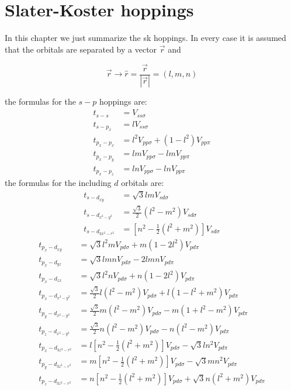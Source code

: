 \chapter{Slater-Koster hoppings}
\label{SKhoppings}
In this chapter we just summarize the \ac{sk} hoppings. In every case it is assumed that the orbitals are separated by a vector $\vec{r}$ and

\begin{equation*}
  \vec{r} \longrightarrow \hat{r}=\frac{\vec{r}}{|\vec{r}|} = (l,m,n)
\end{equation*}

the formulas for the $s-p$ hoppings are:
\begin{equation}
\begin{split}
  t_{s-s} &= V_{ss\sigma}\\
  t_{s-p_x} &= l V_{ss\sigma}\\
  t_{p_x-p_x} &= l^2 V_{pp\sigma} + \left(1-l^2\right) V_{pp\pi}\\
  t_{p_x-p_y} &= lm V_{pp\sigma} - lm V_{pp\pi}\\
  t_{p_x-p_z} &= ln V_{pp\sigma} - ln V_{pp\pi}
\end{split}
\end{equation}
the formulas for the including $d$ orbitals are:
\begin{equation*}
\begin{split}
  t_{s-d_{xy}} &= \sqrt{3}lm V_{sd\sigma}\\
  t_{s-d_{x^2-y^2}} &= \tfrac{\sqrt{3}}{2} (l^2-m^2) V_{sd\sigma}\\
  t_{s-d_{3x^2-r^2}} &= \left[n^2-\frac{1}{2}(l^2+m^2)\right] V_{sd\sigma}
\end{split}
\end{equation*}
\begin{equation*}
\begin{split}
  t_{p_x-d_{xy}} &= \sqrt{3}l^2m V_{pd\sigma} + m(1-2l^2) V_{pd\pi}\\
  t_{p_x-d_{yz}} &= \sqrt{3}lmn V_{pd\sigma} - 2lmn V_{pd\pi}\\
  t_{p_x-d_{zx}} &= \sqrt{3}l^2n V_{pd\sigma} + n(1-2l^2) V_{pd\pi}\\
  t_{p_x-d_{x^2-y^2}} &= \frac{\sqrt{3}}{2}l(l^2-m^2) V_{pd\sigma} +
                         l(1-l^2+m^2) V_{pd\pi}\\
  t_{p_y-d_{x^2-y^2}} &= \tfrac{\sqrt{3}}{2}m(l^2-m^2) V_{pd\sigma} -
                         m(1+l^2-m^2) V_{pd\pi}\\
  t_{p_z-d_{x^2-y^2}} &= \tfrac{\sqrt{3}}{2}n(l^2-m^2) V_{pd\sigma} -
                         n(l^2-m^2) V_{pd\pi}\\
  t_{p_x-d_{3z^2-r^2}} &= l\left[n^2-\tfrac{1}{2}(l^2+m^2)\right] V_{pd\sigma}-
                          \sqrt{3}ln^2 V_{pd\pi}\\
  t_{p_y-d_{3z^2-r^2}} &= m\left[n^2-\tfrac{1}{2}(l^2+m^2)\right] V_{pd\sigma}-
                          \sqrt{3}mn^2 V_{pd\pi}\\
  t_{p_z-d_{3z^2-r^2}} &= n\left[n^2-\tfrac{1}{2}(l^2+m^2)\right] V_{pd\sigma}+
                          \sqrt{3}n(l^2+m^2) V_{pd\pi}
\end{split}
\end{equation*}
